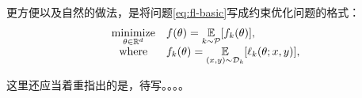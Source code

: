 更方便以及自然的做法，是将问题\eqref{eq:fl-basic}写成约束优化问题的格式：
\begin{equation}
\label{eq:fl-basic-constraint}
\begin{array}{cl}
\begin{array}{cl}
\operatorname*{minimize}\limits_{\theta \in \mathbb{R}^d} & f(\theta) = \operatorname*{\mathbb{E}}\limits_{k \sim {\mathcal{P}}} [f_k(\theta)], \\
\text{where} & f_k(\theta) = \operatorname*{\mathbb{E}}\limits_{(x, y) \sim \mathcal{D}_k} [\ell_k(\theta; x, y)],
\end{array}
\end{array}
\end{equation}

这里还应当着重指出的是，待写。。。。
